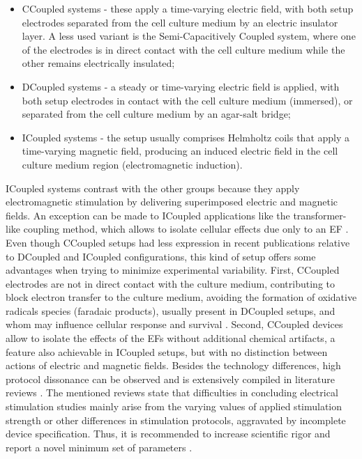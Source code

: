 \begin{itemize}
\item \ac{CCoupled} systems - these apply a time-varying electric field, with both setup electrodes separated from the cell culture medium by an electric insulator layer. A less used variant is the Semi-Capacitively Coupled system, where one of the electrodes is in direct contact with the cell culture medium while the other remains electrically insulated;

\item \ac{DCoupled} systems - a steady or time-varying electric field is applied, with both setup electrodes in contact with the cell culture medium (immersed), or separated from the cell culture medium by an agar-salt bridge;

\item \ac{ICoupled} systems - the setup usually comprises Helmholtz coils that apply a time-varying magnetic field, producing an induced electric field in the cell culture medium region (electromagnetic induction).
\end{itemize}

\ac{ICoupled} systems contrast with the other groups because they apply electromagnetic stimulation by delivering superimposed electric and magnetic fields. An exception can be made to \ac{ICoupled} applications like the transformer-like coupling method, which allows to isolate cellular effects due only to an \ac{EF} \cite{Hess2012-kw}. Even though \ac{CCoupled} setups had less expression in recent publications relative to \ac{DCoupled} and \ac{ICoupled} configurations, this kind of setup offers some advantages when trying to minimize experimental variability. First, \ac{CCoupled} electrodes are not in direct contact with the culture medium, contributing to block electron transfer to the culture medium, avoiding the formation of oxidative radicals species (faradaic products), usually present in \ac{DCoupled} setups, and whom may influence cellular response and survival \cite{Srirussamee2021-cj}. Second, \ac{CCoupled} devices allow to isolate the effects of the \acs{EFs} without additional chemical artifacts, a feature also achievable in ICoupled setups, but with no distinction between actions of electric and magnetic fields. Besides the technology differences, high protocol dissonance can be observed and is extensively compiled in literature reviews \cite{Kim2015-vg, Ryan2021-tq, Da_Silva2020-su, Thrivikraman2018-su}. The mentioned reviews state that difficulties in concluding electrical stimulation studies mainly arise from the varying values of applied stimulation strength or other differences in stimulation protocols, aggravated by incomplete device specification. Thus, it is recommended to increase scientific rigor and report a novel minimum set of parameters \cite{Nicksic2022-jy}.
 
